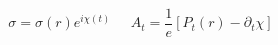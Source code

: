 \begin{equation}
\sigma= \sigma(r)e^{i\chi(t)} \;\;\;\;\; A_t = \frac{1}{e}[P_t(r)-\partial_t
\chi]
\end{equation}

